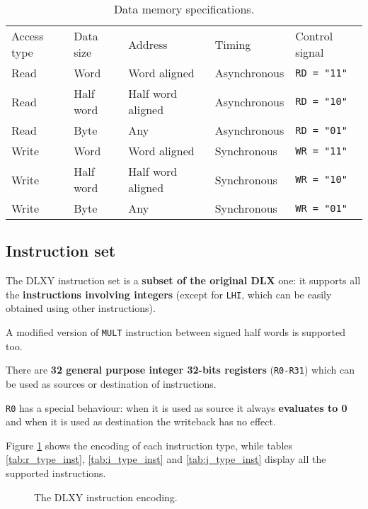 \begin{table}[H]
	\centering
	\begin{tabular}{lllll}
		\hline
		\rowcolor{gray!50}
		Access type & Data size & Address & Timing & Control signal \\
		Read & Word & Word aligned & Asynchronous & \texttt{RD = "11"} \\
		\rowcolor{gray!25}
		Read & Half word & Half word aligned & Asynchronous & \texttt{RD = "10"} \\
		Read & Byte & Any & Asynchronous & \texttt{RD = "01"} \\
		\rowcolor{gray!25}
		Write & Word & Word aligned & Synchronous & \texttt{WR = "11"} \\
		Write & Half word & Half word aligned & Synchronous & \texttt{WR = "10"} \\
		\rowcolor{gray!25}
		Write & Byte & Any & Synchronous & \texttt{WR = "01"} \\
		\hline
	\end{tabular}
	\caption{Data memory specifications.}
	\label{tab:d_mem_specs}
\end{table}

\subsection{Instruction set}
The DLXY instruction set is a \textbf{subset of the original DLX} one:
it supports all the \textbf{instructions involving integers} (except for
\texttt{LHI}, which can be easily obtained using other instructions).

A modified version of \texttt{MULT} instruction between signed half words is
supported too.

\bigskip
There are \textbf{32 general purpose integer 32-bits registers} (\texttt{R0-R31})
which can be used as sources or destination of instructions.

\texttt{R0} has a special behaviour: when it is used as source it always
\textbf{evaluates to 0} and when it is used as destination the writeback
has no effect.

\bigskip
Figure \ref{fig:encoding} shows the encoding of each instruction type, while
tables \ref{tab:r_type_inst}, \ref{tab:i_type_inst} and \ref{tab:j_type_inst}
display all the supported instructions.

\begin{figure}[H]
	\centering
	\caption{The DLXY instruction encoding.}
	\label{fig:encoding}
\end{figure}

